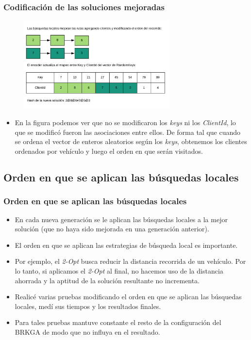 \documentclass{beamer}
\begin{document}
\begin{frame}
\frametitle{Codificación de las soluciones mejoradas}

\begin{figure}[h]
	\centering
	\includegraphics[width=8cm]{codificacionDeSolucionParteDos}
	\label{fig:codificacionDeSolucionParteDos}
\end{figure}

\begin{itemize}
    \item En la figura podemos ver que no se modificaron los \textit{keys} ni los \textit{ClientId}, lo que se modificó fueron las asociaciones entre ellos. De forma tal que cuando se ordena el vector de enteros aleatorios según los \textit{keys}, obtenemos los clientes ordenados por vehículo y luego el orden en que serán visitados.
\end{itemize}

\end{frame}


\subsection{Orden en que se aplican las búsquedas locales}

\begin{frame}
\frametitle{Orden en que se aplican las búsquedas locales}

\begin{itemize}
    \item En cada nueva generación se le aplican las búsquedas locales a la mejor solución (que no haya sido mejorada en una generación anterior).
    \pause
    \item El orden en que se aplican las estrategias de búsqueda local es importante.
    \pause
    \item Por ejemplo, el \textit{2-Opt} busca reducir la distancia recorrida de un vehículo. Por lo tanto, si aplicamos el \textit{2-Opt} al final, no hacemos uso de la distancia ahorrada y la aptitud de la solución resultante no incrementa.
    \pause
    \item Realicé varias pruebas modificando el orden en que se aplican las búsquedas locales, medí sus tiempos y los resultados finales.
    \pause
    \item Para tales pruebas mantuve constante el resto de la configuración del BRKGA de modo que no influya en el resultado.
\end{itemize}

\end{frame}
\end{document}

